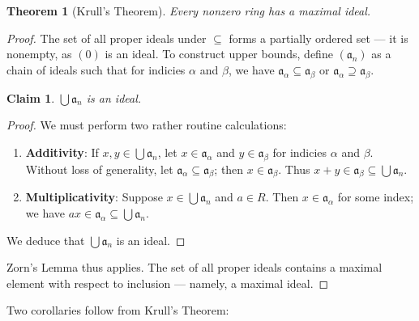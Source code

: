 \documentclass[11pt]{article}
\newtheorem{theorem}{Theorem}
\newtheorem{claim}{Claim}
\begin{document}
\begin{adjustwidth}{0.5cm}{}
	\begin{theorem}[Krull's Theorem]
		Every nonzero ring has a maximal ideal.
	\end{theorem}
	\begin{proof}
		The set of all proper ideals under $\subseteq$ forms a partially ordered set --- it is nonempty, as $(0)$ is an ideal. To construct upper bounds, define $(\mathfrak{a}_{n})$ as a chain of ideals such that for indicies $\alpha$ and $\beta$, we have $\mathfrak{a}_{\alpha} \subseteq \mathfrak{a}_{\beta}$ or $\mathfrak{a}_{\alpha} \supseteq \mathfrak{a}_{\beta}$.
		\begin{adjustwidth}{0.5cm}{}
			\begin{claim}
				$\bigcup \mathfrak{a}_{n}$ is an ideal. 
			\end{claim}
			\begin{proof}\renewcommand{\qedsymbol}{}
				We must perform two rather routine calculations:
				\begin{enumerate}
					\item \textbf{Additivity}: If $x, y \in \bigcup \mathfrak{a}_{n}$, let $x \in \mathfrak{a}_{\alpha}$ and $y \in \mathfrak{a}_{\beta}$ for indicies $\alpha$ and $\beta$. Without loss of generality, let $\mathfrak{a}_{\alpha} \subseteq \mathfrak{a}_{\beta}$; then $x \in \mathfrak{a}_{\beta}$. Thus $x + y \in \mathfrak{a}_{\beta} \subseteq \bigcup \mathfrak{a}_{n}$.
					\item \textbf{Multiplicativity}: Suppose $x \in \bigcup \mathfrak{a}_{n}$ and $a \in R$. Then $x \in \mathfrak{a}_{\alpha}$ for some index; we have $ax \in \mathfrak{a}_{\alpha} \subseteq \bigcup \mathfrak{a}_{n}$.
				\end{enumerate}
				We deduce that $\bigcup \mathfrak{a}_{n}$ is an ideal.
			\end{proof}
		\end{adjustwidth}
		Zorn's Lemma thus applies. The set of all proper ideals contains a maximal element with respect to inclusion --- namely, a maximal ideal.
	\end{proof}
\end{adjustwidth}

Two corollaries follow from Krull's Theorem:

\newpage
\end{document}
